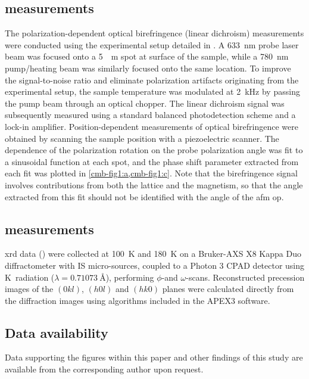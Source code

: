 \subsection{ measurements}

The polarization-dependent optical birefringence (linear dichroism) measurements were conducted using the experimental setup detailed in \citet{little_three-state_2020}.
A \qty{633}{nm} probe laser beam was focused onto a \qty{5}{\mu m} spot at surface of the sample, while a \qty{780}{nm} pump/heating beam was similarly focused onto the same location.
To improve the signal-to-noise ratio and eliminate polarization artifacts originating from the experimental setup, the sample temperature was modulated at \qty{2}{kHz} by passing the pump beam through an optical chopper.
The linear dichroism signal was subsequently measured using a standard balanced photodetection scheme and a lock-in amplifier.
Position-dependent measurements of optical birefringence were obtained by scanning the sample position with a piezoelectric scanner.
The dependence of the polarization rotation on the probe polarization angle was fit to a sinusoidal function at each spot, and the phase shift parameter extracted from each fit was plotted in \cref{cmb-fig1:a,cmb-fig1:c}.
Note that the birefringence signal involves contributions from both the lattice and the magnetism, so that the angle extracted from this fit should not be identified with the angle of the \gls{afm} \gls{op}.

\subsection{ measurements}

\Gls{xrd} data () were collected at \qty{100}{K} and \qty{180}{K} on a Bruker-AXS X8 Kappa Duo diffractometer with I\textmu S micro-sources, coupled to a Photon 3 CPAD detector using  K\textalpha~radiation ($\lambda = \qty{0.71073}{\angstrom}$), performing $\phi$-and $\omega$-scans. 
Reconstructed precession images of the $(0kl)$, $(h0l)$ and $(hk0)$ planes were calculated directly from the diffraction images using algorithms included in the APEX3\citep{apex} software.  

\subsection{Data availability}

Data supporting the figures within this paper and other findings of this study are available from the corresponding author upon request.

